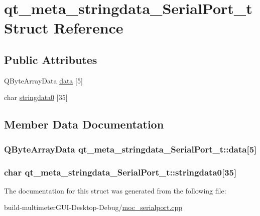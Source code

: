 \hypertarget{structqt__meta__stringdata___serial_port__t}{\section{qt\-\_\-meta\-\_\-stringdata\-\_\-\-Serial\-Port\-\_\-t Struct Reference}
\label{structqt__meta__stringdata___serial_port__t}
}
\subsection*{Public Attributes}
\begin{DoxyCompactItemize}
\item 
Q\-Byte\-Array\-Data \hyperlink{structqt__meta__stringdata___serial_port__t_a5eff824d49af6d7ef6833c31139e772e}{data} \mbox{[}5\mbox{]}
\item 
char \hyperlink{structqt__meta__stringdata___serial_port__t_a0e3fe09eb071d9a68765b5eb255d598e}{stringdata0} \mbox{[}35\mbox{]}
\end{DoxyCompactItemize}


\subsection{Member Data Documentation}
\hypertarget{structqt__meta__stringdata___serial_port__t_a5eff824d49af6d7ef6833c31139e772e}{
\subsubsection[{data}]{\setlength{\rightskip}{0pt plus 5cm}Q\-Byte\-Array\-Data qt\-\_\-meta\-\_\-stringdata\-\_\-\-Serial\-Port\-\_\-t\-::data\mbox{[}5\mbox{]}}}\label{structqt__meta__stringdata___serial_port__t_a5eff824d49af6d7ef6833c31139e772e}
\hypertarget{structqt__meta__stringdata___serial_port__t_a0e3fe09eb071d9a68765b5eb255d598e}{
\subsubsection[{stringdata0}]{\setlength{\rightskip}{0pt plus 5cm}char qt\-\_\-meta\-\_\-stringdata\-\_\-\-Serial\-Port\-\_\-t\-::stringdata0\mbox{[}35\mbox{]}}}\label{structqt__meta__stringdata___serial_port__t_a0e3fe09eb071d9a68765b5eb255d598e}


The documentation for this struct was generated from the following file\-:\begin{DoxyCompactItemize}
\item 
build-\/multimeter\-G\-U\-I-\/\-Desktop-\/\-Debug/\hyperlink{moc__serialport_8cpp}{moc\-\_\-serialport.\-cpp}\end{DoxyCompactItemize}
